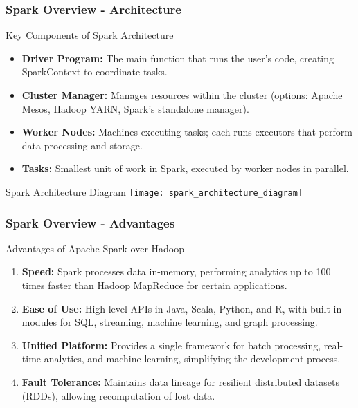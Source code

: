 \documentclass[aspectratio=169]{beamer}
\begin{document}
\begin{frame}[fragile]
    \frametitle{Spark Overview - Architecture}
    \begin{block}{Key Components of Spark Architecture}
        \begin{itemize}
            \item \textbf{Driver Program:} The main function that runs the user's code, creating SparkContext to coordinate tasks.
            \item \textbf{Cluster Manager:} Manages resources within the cluster (options: Apache Mesos, Hadoop YARN, Spark's standalone manager).
            \item \textbf{Worker Nodes:} Machines executing tasks; each runs executors that perform data processing and storage.
            \item \textbf{Tasks:} Smallest unit of work in Spark, executed by worker nodes in parallel.
        \end{itemize}
    \end{block}
    
    \begin{block}{Spark Architecture Diagram}
        \centering
        \texttt{[image: spark\_architecture\_diagram]} %
    \end{block}
\end{frame}

\begin{frame}[fragile]
    \frametitle{Spark Overview - Advantages}
    \begin{block}{Advantages of Apache Spark over Hadoop}
        \begin{enumerate}
            \item \textbf{Speed:} 
                Spark processes data in-memory, performing analytics up to 100 times faster than Hadoop MapReduce for certain applications.
            
            \item \textbf{Ease of Use:}
                High-level APIs in Java, Scala, Python, and R, with built-in modules for SQL, streaming, machine learning, and graph processing.

            \item \textbf{Unified Platform:}
                Provides a single framework for batch processing, real-time analytics, and machine learning, simplifying the development process.

            \item \textbf{Fault Tolerance:}
                Maintains data lineage for resilient distributed datasets (RDDs), allowing recomputation of lost data.
        \end{enumerate}
    \end{block}
\end{frame}
\end{document}

